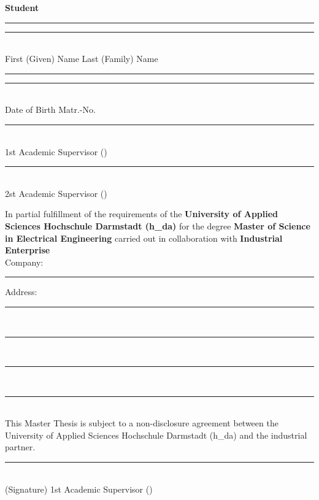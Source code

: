 \textbf{\Large Student}
\par \vspace{10mm}
\rule[0ex]{0.45\textwidth}{0.4pt} \hspace{14mm}
\rule[0ex]{0.45\textwidth}{0.4pt}\\
First (Given) Name \hspace{55mm}
Last (Family) Name
\par \vspace{10mm}
\rule[0ex]{0.45\textwidth}{0.4pt} \hspace{14mm}
\rule[0ex]{0.45\textwidth}{0.4pt}\\
Date of Birth \hspace{66mm}
Matr.-No.


\par \vspace{10mm}
\rule[0ex]{\textwidth}{0.4pt} \\
1st Academic Supervisor (\textit{\supervisor})
\par \vspace{10mm}
\rule[0ex]{\textwidth}{0.4pt} \\
2st Academic Supervisor (\textit{\supervisorsec})


\par \vspace{15mm} 
In partial fulfillment of the requirements of the \textbf{University of Applied Sciences Hochschule Darmstadt (h\_da)} for the degree \textbf{Master of Science in Electrical Engineering} carried out in collaboration with \textbf{Industrial Enterprise}\\[1ex]

Company: \rule[0ex]{0.885\textwidth}{0.4pt} 

Address: \rule[0ex]{0.9\textwidth}{0.4pt}\\[2ex]
\rule[0ex]{\textwidth}{0.4pt} \\[2ex]
\rule[0ex]{\textwidth}{0.4pt} \\[2ex]
\rule[0ex]{\textwidth}{0.4pt} \\[0ex]

This Master Thesis is subject to a non-disclosure agreement between the University of Applied Sciences Hochschule Darmstadt (h\_da) and the industrial partner.

\par \vspace{15mm}
\rule[0ex]{\textwidth}{0.4pt} \\
(Signature) 1st Academic Supervisor (\textit{\supervisor})

